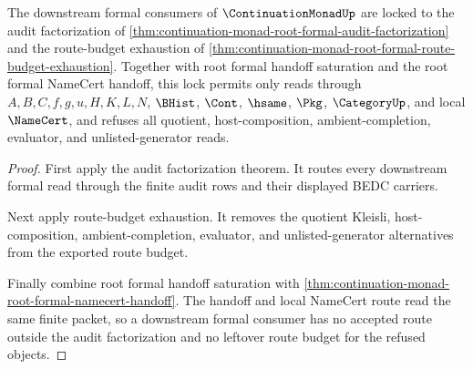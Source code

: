 \begin{theorem}
\label{thm:continuation-monad-root-formal-namecert-consumer-lock}
The downstream formal consumers of $\ContinuationMonadUp$ are locked to the audit factorization of \autoref{thm:continuation-monad-root-formal-audit-factorization} and the route-budget exhaustion of \autoref{thm:continuation-monad-root-formal-route-budget-exhaustion}. Together with root formal handoff saturation and the root formal NameCert handoff, this lock permits only reads through $A,B,C,f,g,u,H,K,L,N$, $\BHist$, $\Cont$, $\hsame$, $\Pkg$, $\CategoryUp$, and local $\NameCert$, and refuses all quotient, host-composition, ambient-completion, evaluator, and unlisted-generator reads.
\end{theorem}
\begin{proof}
First apply the audit factorization theorem. It routes every downstream formal read through the finite audit rows and their displayed BEDC carriers.

Next apply route-budget exhaustion. It removes the quotient Kleisli, host-composition, ambient-completion, evaluator, and unlisted-generator alternatives from the exported route budget.

Finally combine root formal handoff saturation with \autoref{thm:continuation-monad-root-formal-namecert-handoff}. The handoff and local NameCert route read the same finite packet, so a downstream formal consumer has no accepted route outside the audit factorization and no leftover route budget for the refused objects.
\end{proof}

